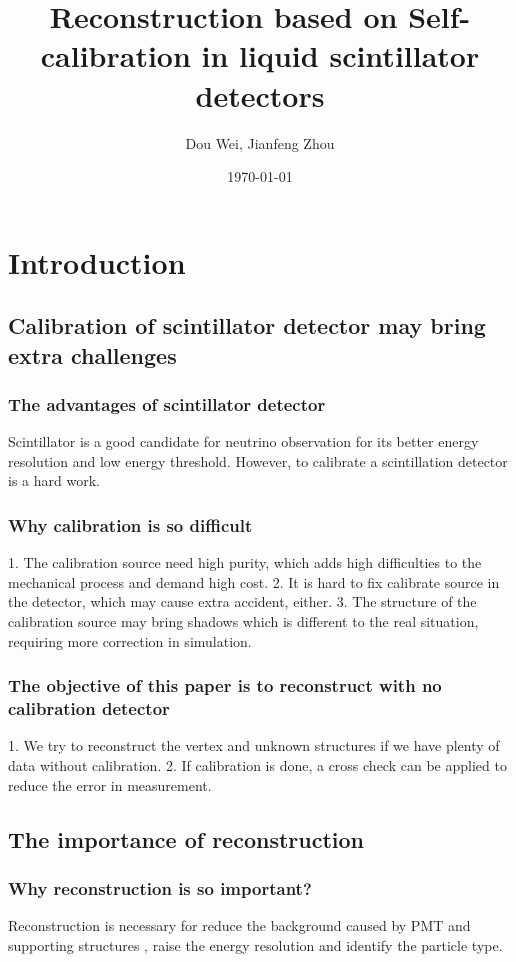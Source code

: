 \documentclass{article}
\title{Reconstruction based on Self-calibration in liquid scintillator detectors}
\author{Dou Wei, Jianfeng Zhou}
\date{\today}
\begin{document}
\maketitle
\abstract{}
\section{Introduction}
\subsection{Calibration of scintillator detector may bring extra challenges}
\subsubsection{The advantages of scintillator detector}
\par Scintillator is a good candidate for neutrino observation for its better energy resolution and low energy threshold. However, to calibrate a scintillation detector is a hard work.
\subsubsection{Why calibration is so difficult}
\par 1. The calibration source need high purity, which adds high difficulties to the mechanical process and demand high cost. 2. It is hard to fix calibrate source in the detector, which may cause extra accident, either. 3. The structure of the calibration source may bring shadows which is different to the real situation, requiring more correction in simulation.
\subsubsection{The objective of this paper is to reconstruct with no calibration detector}
\par 1.  We try to reconstruct the vertex and unknown structures if we have plenty of data without calibration. 2. If calibration is done, a cross check can be applied to reduce the error in measurement. 
\subsection{The importance of reconstruction}
\subsubsection{Why reconstruction is so important?}
\par Reconstruction is necessary for reduce the background caused by PMT and supporting structures , raise the energy resolution and identify the particle type. 
\end{document}
